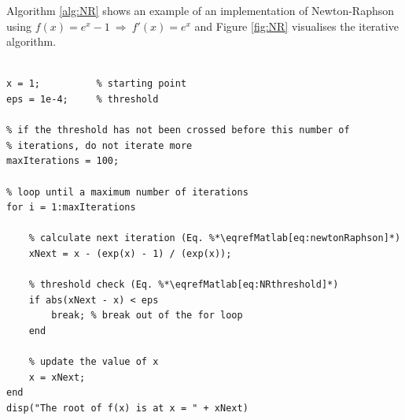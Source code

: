 Algorithm \ref{alg:NR} shows an example of an implementation of Newton-Raphson using $f(x) = e^x -1\ \Rightarrow\ f'(x) = e^x $ and Figure \ref{fig:NR} visualises the iterative algorithm.
\\
\noindent
\begin{minipage}{\textwidth}
\setlstMAT
\begin{lstlisting}[caption={Example of an implementation of the Newton-Raphson method using $f(x) = e^{x} - 1$.}, label=alg:NR]
% An example of the Newton Raphson method using f(x) = exp(x) - 1

x = 1;          % starting point
eps = 1e-4;     % threshold

% if the threshold has not been crossed before this number of 
% iterations, do not iterate more
maxIterations = 100;    
    
% loop until a maximum number of iterations
for i = 1:maxIterations

    % calculate next iteration (Eq. %*\eqrefMatlab[eq:newtonRaphson]*)
    xNext = x - (exp(x) - 1) / (exp(x));

    % threshold check (Eq. %*\eqrefMatlab[eq:NRthreshold]*)
    if abs(xNext - x) < eps 
        break; % break out of the for loop
    end

    % update the value of x
    x = xNext;
end
disp("The root of f(x) is at x = " + xNext)
\end{lstlisting}
\end{minipage}

